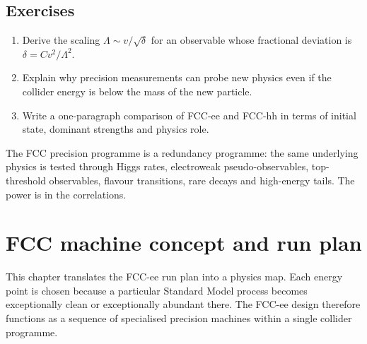 \documentclass[11pt,a4paper]{article}
\numberwithin{equation}{section}
\begin{document}
\subsection{Exercises}

\begin{enumerate}[leftmargin=1.6em]
\item Derive the scaling \(\Lambda\sim v/\sqrt{\delta}\) for an observable whose fractional deviation is \(\delta=Cv^2/\Lambda^2\).
\item Explain why precision measurements can probe new physics even if the collider energy is below the mass of the new particle.
\item Write a one-paragraph comparison of FCC-ee and FCC-hh in terms of initial state, dominant strengths and physics role.
\end{enumerate}

\begin{takehomebox}
The FCC precision programme is a redundancy programme: the same underlying physics is tested through Higgs rates, electroweak pseudo-observables, top-threshold observables, flavour transitions, rare decays and high-energy tails. The power is in the correlations.
\end{takehomebox}


\newpage
\section{FCC machine concept and run plan}
\begin{guidelinebox}
This chapter translates the FCC-ee run plan into a physics map. Each energy point is chosen because a particular Standard Model process becomes exceptionally clean or exceptionally abundant there. The FCC-ee design therefore functions as a sequence of specialised precision machines within a single collider programme.
\end{guidelinebox}
\end{document}
